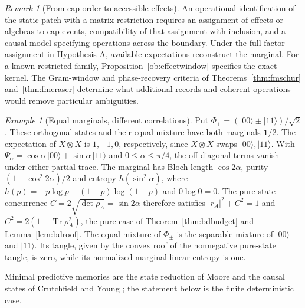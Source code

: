 \documentclass[aps,pra,onecolumn,superscriptaddress,nofootinbib,10pt]{revtex4-2}
\theoremstyle{definition}
\theoremstyle{remark}
\newtheorem{remark}[theorem]{Remark}
\newtheorem{example}[theorem]{Example}
\begin{document}
\begin{remark}[From cap order to accessible effects]\label{ob:capbridge}
An operational identification of the static patch with a matrix
restriction requires an assignment of effects or algebras to cap events,
compatibility of that assignment with inclusion, and a causal model
specifying operations across the boundary. Under the full-factor
assignment in Hypothesis A, available expectations reconstruct the
marginal. For a known restricted family, Proposition~\ref{ob:effectwindow}
specifies the exact kernel. The Gram-window and phase-recovery
criteria of Theorems~\ref{thm:fmschur} and~\ref{thm:fmeraser}
determine what additional records and coherent operations would
remove particular ambiguities.
\end{remark}

\begin{example}[Equal marginals, different correlations]\label{ob:blindbell}
Put \(\Phi_\pm=(|00\rangle\pm|11\rangle)/\sqrt2\). These orthogonal
states and their equal mixture have both marginals \(\mathbf1/2\).
The expectation of \(X\otimes X\) is \(1,-1,0\), respectively, since
\(X\otimes X\) swaps \(|00\rangle,|11\rangle\). With
\(\Psi_\alpha=\cos\alpha\,|00\rangle+\sin\alpha\,|11\rangle\) and
\(0\le\alpha\le\pi/4\), the off-diagonal terms vanish under either
partial trace. The marginal has Bloch length \(\cos 2\alpha\),
purity \((1+\cos^2 2\alpha)/2\) and entropy \(h(\sin^2\alpha)\), where
\(h(p)=-p\log p-(1-p)\log(1-p)\) and \(0\log0=0\).
The pure-state concurrence \(C=2\sqrt{\det\rho_A}=\sin 2\alpha\) therefore
satisfies \(|r_A|^2+C^2=1\) and \(C^2=2(1-\operatorname{Tr}\rho_A^2)\),
the pure case of Theorem~\ref{thm:bdbudget} and Lemma~\ref{lem:bdroof}.
The equal mixture of \(\Phi_\pm\) is the separable mixture of
\(|00\rangle\) and \(|11\rangle\). Its tangle, given by the convex
roof of the nonnegative pure-state tangle, is zero, while its
normalized marginal linear entropy is one.
\end{example}

\noindent Minimal predictive memories are the state reduction of Moore \cite{rf:Moore1956} and the causal states of
Crutchfield and Young \cite{rf:Crutchfield1989}; the statement below is the finite deterministic case.
\end{document}
